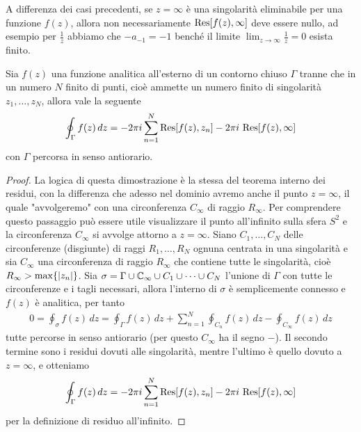 \begin{remark}
  A differenza dei casi precedenti, se $ z = \infty $ è una singolarità eliminabile per una funzione $ f(z) $, allora non necessariamente 
  $ \operatorname{\textnormal{Res}}[ f(z), \infty ] $ deve essere nullo, ad esempio per $ \frac1z $ abbiamo che $ -a_{-1} = -1 $ benché il limite $ \lim_{z \to \infty}\frac1z = 0 $ 
  esista finito.
\end{remark}

\begin{theorem}
  Sia $ f(z) $ una funzione analitica all'esterno di un contorno chiuso $ \Gamma $ tranne che in un numero $ N $ finito di punti, 
  cioè ammette un numero finito di singolarità $ z_1, \dots, z_N $, allora vale la seguente 
  \begin{align}
    \oint_\Gamma f(z) \,dz = -2\pi i \sum_{n = 1}^{N} \operatorname{\textnormal{Res}}[ f(z), z_n ] - 2\pi i \,\operatorname{\textnormal{Res}}[ f(z), \infty ]
  \end{align}
  con $ \Gamma $ percorsa in senso antiorario.
\end{theorem}
\begin{proof}
  La logica di questa dimostrazione è la stessa del teorema interno dei residui, con la differenza che adesso nel dominio avremo anche il punto 
  $ z = \infty $, il quale "avvolgeremo" con una circonferenza $ C_\infty $ di raggio $ R_\infty $. Per comprendere questo passaggio può essere 
  utile visualizzare il punto all'infinito sulla sfera $ S^2 $ e la circonferenza $ C_\infty $ si avvolge attorno a $ z = \infty $. 
  Siano $ C_1, \dots, C_N $ delle circonferenze (disgiunte) di raggi $ R_1, \dots, R_N $ ognuna centrata in una singolarità e sia 
  $ C_\infty $ una circonferenza di raggio $ R_\infty $ che contiene tutte le singolarità, cioè $ R_\infty > \max\{\left|{z_n}\right|\} $. Sia 
  $ \sigma = \Gamma \cup \mathbb{C}_\infty \cup C_1 \cup \dots \cup C_N $ l'unione di $ \Gamma $ con tutte le circonferenze e i tagli necessari,  
  allora l'interno di $ \sigma $ è semplicemente connesso e $ f(z) $ è analitica, per tanto 
  \begin{align}
    0 = \oint_\sigma f(z)\,dz = \oint_\Gamma f(z)\,dz + \sum_{n = 1}^N \oint_{C_n} f(z) \, dz - \oint_{C_\infty} f(z) \,dz
  \end{align}
  tutte percorse in senso antiorario (per questo $ C_\infty $ ha il segno $ - $). Il secondo termine sono i residui dovuti alle singolarità, 
  mentre l'ultimo è quello dovuto a $ z = \infty $, e otteniamo 
  \begin{align}
    \oint_\Gamma f(z)\,dz = - 2\pi i \sum_{n = 1}^{N} \operatorname{\textnormal{Res}}[ f(z), z_n ] - 2\pi i \,\operatorname{\textnormal{Res}}[ f(z), \infty ] 
  \end{align}
  per la definizione di residuo all'infinito.
\end{proof}

